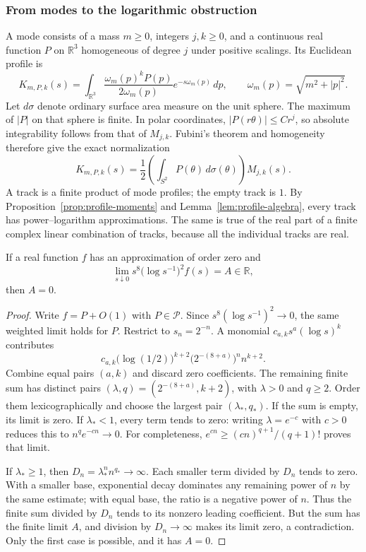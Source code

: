 \subsubsection{From modes to the logarithmic obstruction}
A mode consists of a mass $m\geq0$, integers $j,k\geq0$, and a continuous
real function $P$ on $\mathbb R^3$ homogeneous of degree $j$ under positive
scalings. Its Euclidean profile is
\begin{equation}\label{eq:profile-mode}
 K_{m,P,k}(s)=\int_{\mathbb R^3}
       \frac{\omega_m(p)^kP(p)}{2\omega_m(p)}e^{-s\omega_m(p)}\,dp,
 \qquad \omega_m(p)=\sqrt{m^2+|p|^2}.
\end{equation}
Let $d\sigma$ denote ordinary surface area measure on the unit sphere.
The maximum of $|P|$ on that sphere is finite. In polar coordinates,
$|P(r\theta)|\leq Cr^j$, so absolute integrability follows from that
of $M_{j,k}$. Fubini's theorem and homogeneity therefore give the exact
normalization
\begin{equation}\label{eq:profile-angular}
 K_{m,P,k}(s)=\frac12\left(\int_{S^2}P(\theta)\,d\sigma(\theta)\right)
                         M_{j,k}(s).
\end{equation}
A track is a finite product of mode profiles; the empty track is $1$.
By Proposition~\ref{prop:profile-moments} and
Lemma~\ref{lem:profile-algebra}, every track has power--logarithm
approximations. The same is true of the real part of a finite complex
linear combination of tracks, because all the individual tracks are real.

\begin{lemma}\label{lem:profile-log}
If a real function $f$ has an approximation of order zero and
\[
 \lim_{s\downarrow0}s^8\bigl(\log s^{-1}\bigr)^2f(s)=A\in\mathbb R,
\]
then $A=0$.
\end{lemma}
\begin{proof}
Write $f=P+O(1)$ with $P\in\mathcal P$. Since
$s^8(\log s^{-1})^2\to0$, the same weighted limit holds for $P$.
Restrict to $s_n=2^{-n}$. A monomial $c_{a,k}s^a(\log s)^k$ contributes
\[
 c_{a,k}\bigl(\log(1/2)\bigr)^{k+2}
             \bigl(2^{-(8+a)}\bigr)^n n^{k+2}.
\]
Combine equal pairs $(a,k)$ and discard zero coefficients. The remaining
finite sum has distinct pairs $(\lambda,q)=(2^{-(8+a)},k+2)$,
with $\lambda>0$ and $q\geq2$. Order them lexicographically and choose
the largest pair $(\lambda_*,q_*)$. If the sum is empty, its limit is
zero. If $\lambda_*<1$, every term tends to zero: writing
$\lambda=e^{-c}$ with $c>0$ reduces this to $n^qe^{-cn}\to0$.
For completeness, $e^{cn}\geq(cn)^{q+1}/(q+1)!$ proves that limit.

If $\lambda_*\geq1$, then $D_n=\lambda_*^n n^{q_*}\to\infty$.
Each smaller term divided by $D_n$ tends to zero. With a smaller base,
exponential decay dominates any remaining power of $n$ by the same
estimate; with equal base, the ratio is a negative power of $n$.
Thus the finite sum divided by $D_n$ tends to its nonzero leading
coefficient. But the sum has the finite limit $A$, and division by
$D_n\to\infty$ makes its limit zero, a contradiction. Only the first
case is possible, and it has $A=0$.
\end{proof}

